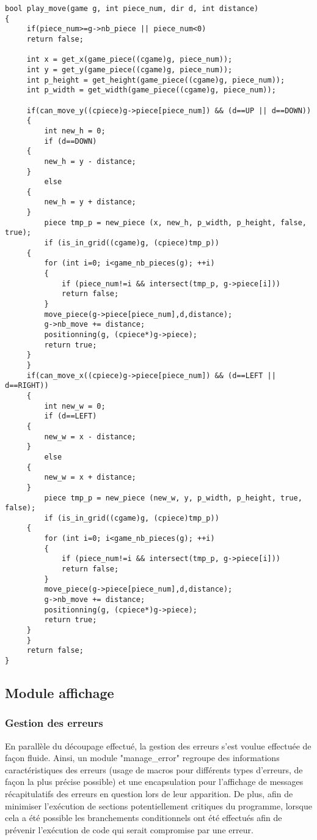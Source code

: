 \documentclass{report}
\begin{document}
\begin{lstlisting}
bool play_move(game g, int piece_num, dir d, int distance)
{
     if(piece_num>=g->nb_piece || piece_num<0)
	 return false;
  
     int x = get_x(game_piece((cgame)g, piece_num));
     int y = get_y(game_piece((cgame)g, piece_num));
     int p_height = get_height(game_piece((cgame)g, piece_num));
     int p_width = get_width(game_piece((cgame)g, piece_num));

     if(can_move_y((cpiece)g->piece[piece_num]) && (d==UP || d==DOWN))
     {
         int new_h = 0;
         if (d==DOWN)
	 {
	     new_h = y - distance;
	 }
         else
	 {
  	     new_h = y + distance;
	 }
         piece tmp_p = new_piece (x, new_h, p_width, p_height, false, true);
         if (is_in_grid((cgame)g, (cpiece)tmp_p))
	 {
	     for (int i=0; i<game_nb_pieces(g); ++i)
	     {
	         if (piece_num!=i && intersect(tmp_p, g->piece[i]))
		     return false;
	     }
	     move_piece(g->piece[piece_num],d,distance);
	     g->nb_move += distance;
	     positionning(g, (cpiece*)g->piece);
	     return true;
	 }
     }
     if(can_move_x((cpiece)g->piece[piece_num]) && (d==LEFT || d==RIGHT))
     {
         int new_w = 0;
         if (d==LEFT)
	 {
	     new_w = x - distance;
	 }
         else 
	 {
	     new_w = x + distance;
	 }
         piece tmp_p = new_piece (new_w, y, p_width, p_height, true, false);
         if (is_in_grid((cgame)g, (cpiece)tmp_p))
	 {
	     for (int i=0; i<game_nb_pieces(g); ++i)
	     {
	         if (piece_num!=i && intersect(tmp_p, g->piece[i]))
		     return false;
	     }
	     move_piece(g->piece[piece_num],d,distance);
	     g->nb_move += distance;
	     positionning(g, (cpiece*)g->piece);
	     return true;
	 }
     }
     return false;
}
\end{lstlisting}

\subsection{Module affichage}
\subsubsection*{Gestion des erreurs}
En parallèle du découpage effectué, la gestion des erreurs s'est voulue effectuée de façon fluide. Ainsi, un module "manage\_error" regroupe des informations caractéristiques des erreurs (usage de macros pour différents types d'erreurs, de façon la plus précise possible) et une encapsulation pour l'affichage de messages récapitulatifs des erreurs en question lors de leur apparition.
De plus, afin de minimiser l'exécution de sections potentiellement critiques du programme, lorsque cela a été possible les branchements conditionnels ont été effectués afin de prévenir l'exécution de code qui serait compromise par une erreur.
\end{document}
